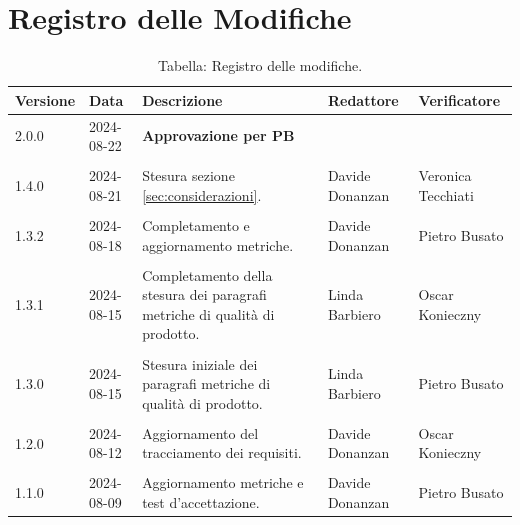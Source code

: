 \documentclass[8pt]{article}
\begin{document}
\section*{Registro delle Modifiche}
\begin{table}[ht!]	
	\centering
	\begin{tabular}{p{1.2cm} p{2cm} p{5cm} p{3cm} p{3cm}}
		\toprule
		\textbf{Versione}& \textbf{Data} & \textbf{Descrizione} & \textbf{Redattore} & \textbf{Verificatore} \\
		\midrule
        2.0.0 & 2024-08-22 & \textbf{Approvazione per PB} & & \\\\
        1.4.0 & 2024-08-21 & Stesura sezione \ref{sec:considerazioni}. & Davide Donanzan & Veronica Tecchiati \\\\
        1.3.2 & 2024-08-18 & Completamento e aggiornamento metriche. & Davide Donanzan & Pietro Busato \\\\
        1.3.1 & 2024-08-15 & Completamento della stesura dei paragrafi metriche di qualità di prodotto. & Linda Barbiero & Oscar Konieczny \\\\
        1.3.0 & 2024-08-15 & Stesura iniziale dei paragrafi metriche di qualità di prodotto. & Linda Barbiero & Pietro Busato \\\\
        1.2.0 & 2024-08-12 & Aggiornamento del tracciamento dei requisiti. & Davide Donanzan & Oscar Konieczny \\\\
        1.1.0 & 2024-08-09 & Aggiornamento metriche e test d'accettazione. & Davide Donanzan & Pietro Busato \\
		\bottomrule
	\end{tabular}
	\caption*{Tabella: Registro delle modifiche.}
	\label{table:Registro delle modifiche}
\end{table}
\newpage
\end{document}
